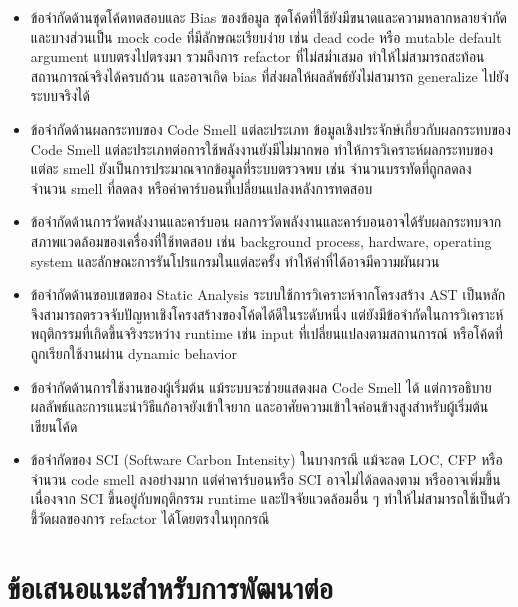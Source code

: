 \begin{itemize}
    \item {\boldfont ข้อจำกัดด้านชุดโค้ดทดสอบและ Bias ของข้อมูล}
    ชุดโค้ดที่ใช้ยังมีขนาดและความหลากหลายจำกัด และบางส่วนเป็น {\italicfont mock code} ที่มีลักษณะเรียบง่าย เช่น {\italicfont dead code} หรือ {\italicfont mutable default argument} แบบตรงไปตรงมา รวมถึงการ refactor ที่ไม่สม่ำเสมอ ทำให้ไม่สามารถสะท้อนสถานการณ์จริงได้ครบถ้วน และอาจเกิด {\italicfont bias} ที่ส่งผลให้ผลลัพธ์ยังไม่สามารถ {\italicfont generalize} ไปยังระบบจริงได้

    \item {\boldfont ข้อจำกัดด้านผลกระทบของ Code Smell แต่ละประเภท}
    ข้อมูลเชิงประจักษ์เกี่ยวกับผลกระทบของ Code Smell แต่ละประเภทต่อการใช้พลังงานยังมีไม่มากพอ ทำให้การวิเคราะห์ผลกระทบของแต่ละ smell ยังเป็นการประมาณจากข้อมูลที่ระบบตรวจพบ เช่น จำนวนบรรทัดที่ถูกลดลง จำนวน smell ที่ลดลง หรือค่าคาร์บอนที่เปลี่ยนแปลงหลังการทดสอบ

    \item {\boldfont ข้อจำกัดด้านการวัดพลังงานและคาร์บอน}
    ผลการวัดพลังงานและคาร์บอนอาจได้รับผลกระทบจากสภาพแวดล้อมของเครื่องที่ใช้ทดสอบ เช่น background process, hardware, operating system และลักษณะการรันโปรแกรมในแต่ละครั้ง ทำให้ค่าที่ได้อาจมีความผันผวน

    \item {\boldfont ข้อจำกัดด้านขอบเขตของ Static Analysis}
    ระบบใช้การวิเคราะห์จากโครงสร้าง AST เป็นหลัก จึงสามารถตรวจจับปัญหาเชิงโครงสร้างของโค้ดได้ดีในระดับหนึ่ง แต่ยังมีข้อจำกัดในการวิเคราะห์พฤติกรรมที่เกิดขึ้นจริงระหว่าง runtime เช่น input ที่เปลี่ยนแปลงตามสถานการณ์ หรือโค้ดที่ถูกเรียกใช้งานผ่าน dynamic behavior

    \item {\boldfont ข้อจำกัดด้านการใช้งานของผู้เริ่มต้น}
    แม้ระบบจะช่วยแสดงผล Code Smell ได้ แต่การอธิบายผลลัพธ์และการแนะนำวิธีแก้อาจยังเข้าใจยาก และอาศัยความเข้าใจค่อนข้างสูงสำหรับผู้เริ่มต้นเขียนโค้ด

    \item {\boldfont ข้อจำกัดของ SCI (Software Carbon Intensity) ในบางกรณี}
    แม้จะลด LOC, CFP หรือจำนวน {\italicfont code smell} ลงอย่างมาก แต่ค่าคาร์บอนหรือ SCI อาจไม่ได้ลดลงตาม หรืออาจเพิ่มขึ้น เนื่องจาก SCI ขึ้นอยู่กับพฤติกรรม {\italicfont runtime} และปัจจัยแวดล้อมอื่น ๆ ทำให้ไม่สามารถใช้เป็นตัวชี้วัดผลของการ refactor ได้โดยตรงในทุกกรณี
\end{itemize}


\section{ข้อเสนอแนะสำหรับการพัฒนาต่อ}

